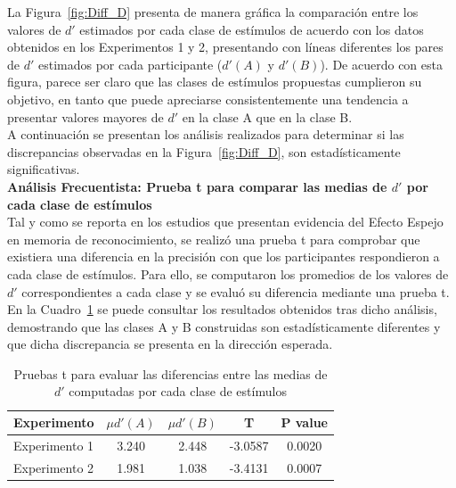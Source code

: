 La Figura~\ref{fig:Diff_D} presenta de manera gráfica la comparación entre los valores de $d'$ estimados por cada clase de estímulos de acuerdo con los datos obtenidos en los Experimentos 1 y 2, presentando con líneas diferentes los pares de $d'$ estimados por cada participante ($d'(A)$ y $d'(B)$). De acuerdo con esta figura, parece ser claro que las clases de estímulos propuestas cumplieron su objetivo, en tanto que puede apreciarse consistentemente una tendencia a presentar valores mayores de $d'$ en la clase A que en la clase B.\\

A continuación se presentan los análisis realizados para determinar si las discrepancias observadas en la Figura~\ref{fig:Diff_D}, son estadísticamente significativas.\\

\textbf{Análisis Frecuentista: Prueba t para comparar las medias de $d'$ por cada clase de estímulos}\\

Tal y como se reporta en los estudios que presentan evidencia del Efecto Espejo en memoria de reconocimiento, se realizó una prueba t para comprobar que existiera una diferencia en la precisión con que los participantes respondieron a cada clase de estímulos. Para ello, se computaron los promedios de los valores de $d'$ correspondientes a cada clase y se evaluó su diferencia mediante una prueba t. En la Cuadro~\ref{Cuadro_t-Dprimas} se puede consultar los resultados obtenidos tras dicho análisis, demostrando que las clases A y B construidas son estadísticamente diferentes y que dicha discrepancia se presenta en la dirección esperada.\\

\begin{table}[h]
\caption[Prueba t para evaluar las diferencias entre las medias de $d'$ por clase de estímulos]{Pruebas t para evaluar las diferencias entre las medias de $d'$ computadas por cada clase de estímulos}
\label{Cuadro_t-Dprimas}
\centering
\begin{tabular}{l | c c c c}
\toprule
\textbf{Experimento} & \textbf{$\mu d'(A)$} & \textbf{$\mu d'(B)$} & \textbf{T}  & \textbf{P value}\\
\midrule
Experimento 1 & 3.240 & 2.448 & -3.0587 & 0.0020 \\
Experimento 2 & 1.981 & 1.038 & -3.4131 & 0.0007 \\
\bottomrule
\end{tabular}
\end{table}

